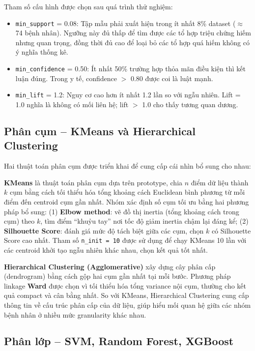 Tham số cấu hình được chọn sau quá trình thử nghiệm:
\begin{itemize}
    \item \texttt{min\_support} = 0.08: Tập mẫu phải xuất hiện trong ít nhất 8\% dataset ($\approx$ 74 bệnh nhân). Ngưỡng này đủ thấp để tìm được các tổ hợp triệu chứng hiếm nhưng quan trọng, đồng thời đủ cao để loại bỏ các tổ hợp quá hiếm không có ý nghĩa thống kê.
    \item \texttt{min\_confidence} = 0.50: Ít nhất 50\% trường hợp thỏa mãn điều kiện thì kết luận đúng. Trong y tế, confidence $>$ 0.80 được coi là luật mạnh.
    \item \texttt{min\_lift} = 1.2: Nguy cơ cao hơn ít nhất 1.2 lần so với ngẫu nhiên. Lift = 1.0 nghĩa là không có mối liên hệ; lift $>$ 1.0 cho thấy tương quan dương.
\end{itemize}

\subsection{Phân cụm -- KMeans và Hierarchical Clustering}

Hai thuật toán phân cụm được triển khai để cung cấp cái nhìn bổ sung cho nhau:

\textbf{KMeans} \cite{lloyd1982least} là thuật toán phân cụm dựa trên prototype, chia $n$ điểm dữ liệu thành $k$ cụm bằng cách tối thiểu hóa tổng khoảng cách Euclidean bình phương từ mỗi điểm đến centroid cụm gần nhất. Nhóm xác định số cụm tối ưu bằng hai phương pháp bổ sung: (1) \textbf{Elbow method}: vẽ đồ thị inertia (tổng khoảng cách trong cụm) theo $k$, tìm điểm ``khuỷu tay'' nơi tốc độ giảm inertia chậm lại đáng kể; (2) \textbf{Silhouette Score}: đánh giá mức độ tách biệt giữa các cụm, chọn $k$ có Silhouette Score cao nhất. Tham số \texttt{n\_init = 10} được sử dụng để chạy KMeans 10 lần với các centroid khởi tạo ngẫu nhiên khác nhau, chọn kết quả tốt nhất.

\textbf{Hierarchical Clustering (Agglomerative)} xây dựng cây phân cấp (dendrogram) bằng cách gộp hai cụm gần nhất tại mỗi bước. Phương pháp linkage \textbf{Ward} được chọn vì tối thiểu hóa tổng variance nội cụm, thường cho kết quả compact và cân bằng nhất. So với KMeans, Hierarchical Clustering cung cấp thông tin về cấu trúc phân cấp của dữ liệu, giúp hiểu mối quan hệ giữa các nhóm bệnh nhân ở nhiều mức granularity khác nhau.

\subsection{Phân lớp -- SVM, Random Forest, XGBoost}

